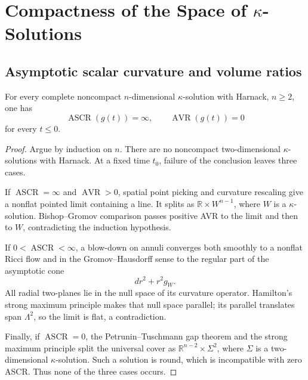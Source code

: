 \chapter[20]{\texorpdfstring{Compactness of the Space of $\kappa$-Solutions}{Compactness of the Space of Kappa-Solutions}}
\label{ch:chow-iii-compactness-kappa-solutions}

\section{Asymptotic scalar curvature and volume ratios}

\begin{theorem}[$\kappa$-solutions with Harnack have ASCR $=\infty$ and AVR $=0$]
\label{thm:chow-iii-kappa-harnack-ascr-avr}
For every complete noncompact $n$-dimensional $\kappa$-solution with Harnack,
$n\ge2$, one has
\[
 \operatorname{ASCR}(g(t))=\infty,
 \qquad \operatorname{AVR}(g(t))=0
\]
for every $t\le0$.
\end{theorem}
\begin{proof}
\sketch Argue by induction on $n$.  There are no noncompact two-dimensional
$\kappa$-solutions with Harnack.  At a fixed time $t_0$, failure of the
conclusion leaves three cases.

If $\operatorname{ASCR}=\infty$ and $\operatorname{AVR}>0$, spatial point
picking and curvature rescaling give a nonflat pointed limit containing a
line.  It splits as $\mathbb R\times W^{n-1}$, where $W$ is a
$\kappa$-solution.  Bishop--Gromov comparison passes positive AVR to the
limit and then to $W$, contradicting the induction hypothesis.

If $0<\operatorname{ASCR}<\infty$, a blow-down on annuli converges both
smoothly to a nonflat Ricci flow and in the Gromov--Hausdorff sense to the
regular part of the asymptotic cone
\[
 dr^2+r^2g_W.
\]
All radial two-planes lie in the null space of its curvature operator.
Hamilton's strong maximum principle makes that null space parallel; its
parallel translates span $\Lambda^2$, so the limit is flat, a contradiction.

Finally, if $\operatorname{ASCR}=0$, the Petrunin--Tuschmann gap theorem and
the strong maximum principle split the universal cover as
$\mathbb R^{n-2}\times\Sigma^2$, where $\Sigma$ is a two-dimensional
$\kappa$-solution.  Such a solution is round, which is incompatible with
zero ASCR.  Thus none of the three cases occurs.
\end{proof}


